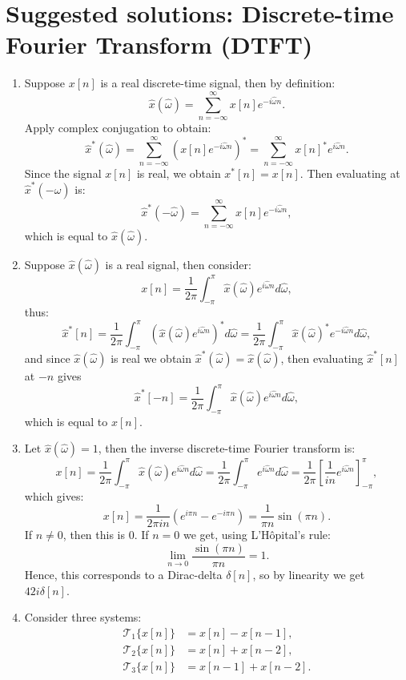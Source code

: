 \newpage
\section{Suggested solutions: Discrete-time Fourier Transform (DTFT)}
\begin{enumerate}
\item Suppose $x[n]$ is a real discrete-time signal, then by definition:
$$\hat{x}(\hat{\omega})=\sum_{n=-\infty}^{\infty}x[n]e^{-i\hat{\omega}n}.$$
Apply complex conjugation to obtain:
$$\hat{x}^{*}(\hat{\omega})=\sum_{n=-\infty}^{\infty}(x[n]e^{-i\hat{\omega}n})^{*}=\sum_{n=-\infty}^{\infty}x[n]^{*}e^{i\hat{\omega}n}.$$
Since the signal $x[n]$ is real, we obtain $x^{*}[n]=x[n]$. Then evaluating at $\hat{x}^{*}(-\hat{\omega})$ is:
$$\hat{x}^{*}(-\hat{\omega})=\sum_{n=-\infty}^{\infty}x[n]e^{-i\hat{\omega}n},$$
which is equal to $\hat{x}(\hat{\omega})$. 

\item Suppose $\hat{x}(\hat{\omega})$ is a real signal, then consider:
$$x[n]=\frac{1}{2\pi}\int_{-\pi}^{\pi}\hat{x}(\hat{\omega})e^{i\hat{\omega}n}d\hat{\omega},$$
thus:
$$\hat{x}^{*}[n]=\frac{1}{2\pi}\int_{-\pi}^{\pi}(\hat{x}(\hat{\omega})e^{i\hat{\omega}n})^{*}d\hat{\omega}=\frac{1}{2\pi}\int_{-\pi}^{\pi}\hat{x}(\hat{\omega})^{*}e^{-i\hat{\omega}n}d\hat{\omega},$$
and since $\hat{x}(\hat{\omega})$ is real we obtain $\hat{x}^{*}(\hat{\omega})=\hat{x}(\hat{\omega})$, then evaluating $\hat{x}^{*}[n]$ at $-n$ gives
$$\hat{x}^{*}[-n]=\frac{1}{2\pi}\int_{-\pi}^{\pi}\hat{x}(\hat{\omega})e^{i\hat{\omega}n}d\hat{\omega},$$
which is equal to $x[n]$. 

\item Let $\hat{x}(\hat{\omega})=1$, then the inverse discrete-time Fourier transform is:
$$x[n]=\frac{1}{2\pi}\int_{-\pi}^{\pi}\hat{x}(\hat{\omega})e^{i\hat{\omega}n}d\hat{\omega}=\frac{1}{2\pi}\int_{-\pi}^{\pi}e^{i\hat{\omega}n}d\hat{\omega}=\frac{1}{2\pi}\left[\frac{1}{in}e^{i\hat{\omega}n}\right]_{-\pi}^{\pi},$$
which gives:
$$x[n]=\frac{1}{2\pi in}(e^{i\pi n}-e^{-i\pi n})=\frac{1}{\pi n}\sin(\pi n).$$
If $n\neq 0$, then this is $0$. If $n=0$ we get, using L'Hôpital's rule:
$$\lim_{n\to 0}\frac{\sin(\pi n)}{\pi n}=1.$$
Hence, this corresponds to a Dirac-delta $\delta[n]$, so by linearity we get $42i\delta[n]$. 

\item Consider three systems:
\begin{align*}
    \mathcal{T}_{1}\{x[n]\}&=x[n]-x[n-1], \\
    \mathcal{T}_{2}\{x[n]\}&=x[n]+x[n-2], \\
    \mathcal{T}_{3}\{x[n]\}&=x[n-1]+x[n-2].
\end{align*}


\end{enumerate}
